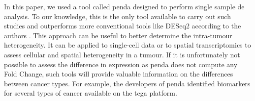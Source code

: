 In this paper, we used a tool called \acrfull{penda} designed to perform single sample \acrlong{de} analysis.
To our knowledge, this is the only tool available to carry out such studies and outperforms more conventional tools like DESeq2 according to the authors \cite*{Richard2020}.
This approach can be useful to better determine the intra-tumour heterogeneity.
It can be applied to single-cell data or to spatial transcriptomics to assess cellular and spatial heterogeneity in a tumour.
If it is unfortunately not possible to assess the difference in expression as \acrshort{penda} does not compute any Fold Change, such tools will provide valuable information on the differences between cancer types.
For example, the developers of \acrshort{penda} identified biomarkers for several types of cancer available on the \acrshort{tcga} platform.